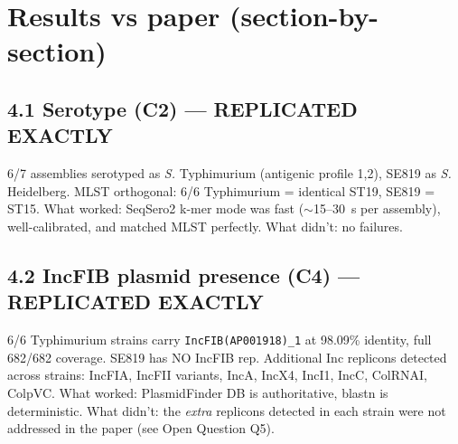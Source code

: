\documentclass[10pt]{article}
\begin{document}
\section{Results vs paper (section-by-section)}

\subsection{4.1 Serotype (C2) --- \textbf{REPLICATED EXACTLY}}
6/7 assemblies serotyped as \emph{S.} Typhimurium (antigenic profile 1,2), SE819 as \emph{S.} Heidelberg. MLST orthogonal: 6/6 Typhimurium = identical ST19, SE819 = ST15. What worked: SeqSero2 k-mer mode was fast ($\sim$15--30~s per assembly), well-calibrated, and matched MLST perfectly. What didn't: no failures.

\subsection{4.2 IncFIB plasmid presence (C4) --- \textbf{REPLICATED EXACTLY}}
6/6 Typhimurium strains carry \texttt{IncFIB(AP001918)\_1} at 98.09\% identity, full 682/682 coverage. SE819 has NO IncFIB rep. Additional Inc replicons detected across strains: IncFIA, IncFII variants, IncA, IncX4, IncI1, IncC, ColRNAI, ColpVC. What worked: PlasmidFinder DB is authoritative, blastn is deterministic. What didn't: the \emph{extra} replicons detected in each strain were not addressed in the paper (see Open Question Q5).
\end{document}
